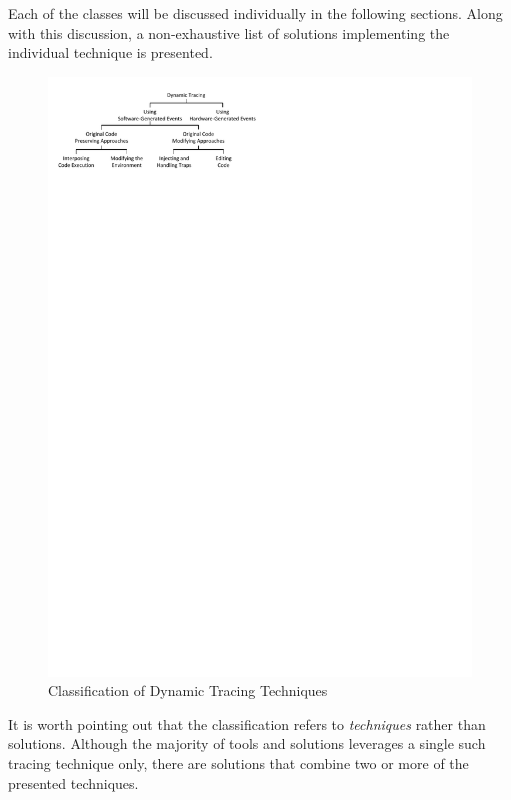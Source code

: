 Each of the classes will be discussed individually in the following sections. Along with
this discussion, a non-exhaustive list of solutions implementing the individual technique
is presented.

\begin{figure}[htbp] 
\begin{centering} 
\includegraphics[scale=1.3, clip=true, viewport=0cm 25cm 11cm 30cm]{images/diagrams/Classification.pdf} 
\caption{Classification of Dynamic Tracing Techniques} 
\label{Classification} 
\end{centering} 
\end{figure}

It is worth pointing out that the classification refers to \emph{techniques} rather than
solutions. Although the majority of tools and solutions leverages a single 
such tracing technique only, there are solutions that combine two or more 
of the presented techniques.

